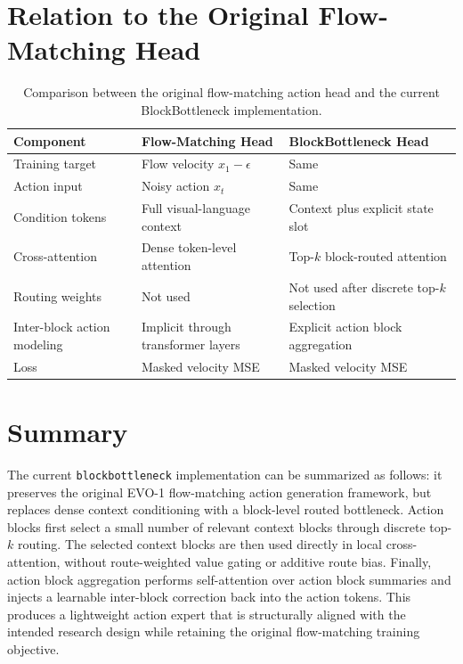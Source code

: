 \documentclass[11pt]{article}
\begin{document}
\section{Relation to the Original Flow-Matching Head}

\begin{table}[h]
\centering
\begin{tabular}{lll}
\toprule
Component & Flow-Matching Head & BlockBottleneck Head \\
\midrule
Training target & Flow velocity $x_1 - \epsilon$ & Same \\
Action input & Noisy action $x_t$ & Same \\
Condition tokens & Full visual-language context & Context plus explicit state slot \\
Cross-attention & Dense token-level attention & Top-$k$ block-routed attention \\
Routing weights & Not used & Not used after discrete top-$k$ selection \\
Inter-block action modeling & Implicit through transformer layers & Explicit action block aggregation \\
Loss & Masked velocity MSE & Masked velocity MSE \\
\bottomrule
\end{tabular}
\caption{Comparison between the original flow-matching action head and the current BlockBottleneck implementation.}
\label{tab:flowmatching_blockbottleneck}
\end{table}

\section{Summary}

The current \texttt{blockbottleneck} implementation can be summarized as follows: it preserves the original EVO-1 flow-matching action generation framework, but replaces dense context conditioning with a block-level routed bottleneck. Action blocks first select a small number of relevant context blocks through discrete top-$k$ routing. The selected context blocks are then used directly in local cross-attention, without route-weighted value gating or additive route bias. Finally, action block aggregation performs self-attention over action block summaries and injects a learnable inter-block correction back into the action tokens. This produces a lightweight action expert that is structurally aligned with the intended research design while retaining the original flow-matching training objective.
\end{document}
